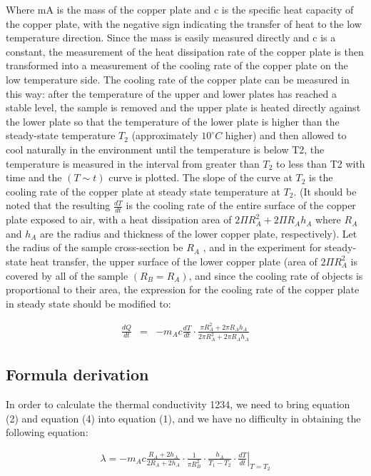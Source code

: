 \documentclass[UTF8]{article}
\begin{document}
	Where mA is the mass of the copper plate and c is the specific heat capacity of the copper plate, with the negative sign indicating the transfer of heat to the low temperature direction. Since the mass is easily measured directly and c is a constant, the measurement of the heat dissipation rate of the copper plate is then transformed into a measurement of the cooling rate of the copper plate on the low temperature side. The cooling rate of the copper plate can be measured in this way: after the temperature of the upper and lower plates has reached a stable level, the sample is removed and the upper plate is heated directly against the lower plate so that the temperature of the lower plate is higher than the steady-state temperature $T_{2}$ (approximately $10^{\circ} C$ higher) and then allowed to cool naturally in the environment until the temperature is below T2, the temperature is measured in the interval from greater than $T_{2}$ to less than T2 with time and the $\left ( T\sim t \right ) $ curve is plotted. The slope of the curve at $T_{2}$ is the cooling rate of the copper plate at steady state temperature at $T_{2}$. (It should be noted that the resulting $\frac{dT}{dt}$ is the cooling rate of the entire surface of the copper plate exposed to air, with a heat dissipation area of $2\Pi R_{A} ^{2} +2\Pi R_{A}h_{A} $ where $R_{A}$ and $h_{A}$ are the radius and thickness of the lower copper plate, respectively). Let the radius of the sample cross-section be $R_{A}$ , and in the experiment for steady-state heat transfer, the upper surface of the lower copper plate (area of $2\Pi R_{A} ^{2}$ is covered by all of the sample $\left ( R_{B}=R_{A} \right ) $, and since the cooling rate of objects is proportional to their area, the expression for the cooling rate of the copper plate in steady state should be modified to:
	
	\begin{eqnarray}\frac{dQ}{dt} & = & -m_{A} c\frac{dT}{dt}  \cdot \frac{\pi R_{A} ^{2} +2\pi R_{A}h_{A}}{2\pi R_{A} ^{2} +2\pi R_{A}h_{A}} \end{eqnarray}

	\subsection{Formula derivation}
    In order to calculate the thermal conductivity 1234, we need to bring equation (2) and equation (4) into equation (1), and we have no difficulty in obtaining the following equation:
    
    \begin{eqnarray}\lambda  =  -m_{A}c\frac{R_{A}+2h_{A}  }{2R_{A}+2h_{A}}  \cdot \frac{1}{\pi R_{B}^2 }\cdot \frac{h_{A} }{T_{1}-T_{2}  }\cdot\left. \frac{dT}{dt} \right| _{T  =  T_{2} }    \end{eqnarray}
    
\end{document}
